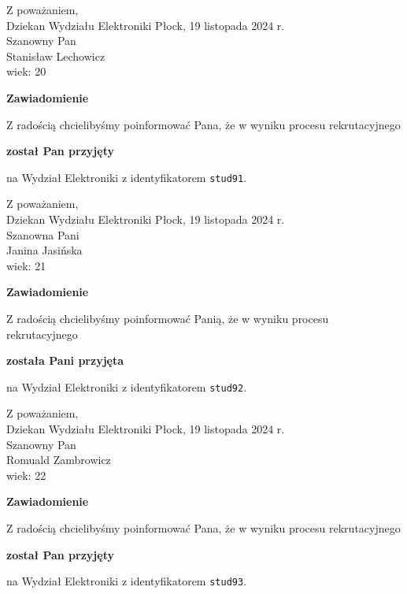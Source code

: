 \documentclass[12pt,a4paper]{article}
\begin{document}
\noindent
Z poważaniem,\\
Dziekan
Wydziału Elektroniki
\newpage
\hfill Płock, 19 listopada 2024 r.\\ 
\noindent 
Szanowny Pan \\
Stanisław Lechowicz \\
wiek: 20

\bigskip

\begin{center}
{\Large\textbf{Zawiadomienie}}
\end{center}
\bigskip
Z radością chcielibyśmy poinformować Pana, że w wyniku procesu rekrutacyjnego
\begin{center}
\textsf{\textbf{został Pan przyjęty}} 
\end{center}
na Wydział Elektroniki z identyfikatorem \verb|stud91|.
\vspace{2cm}

\noindent
Z poważaniem,\\
Dziekan
Wydziału Elektroniki
\newpage
\hfill Płock, 19 listopada 2024 r.\\ 
\noindent 
Szanowna Pani \\
Janina Jasińska \\
wiek: 21

\bigskip

\begin{center}
{\Large\textbf{Zawiadomienie}}
\end{center}
\bigskip
Z radością chcielibyśmy poinformować Panią, że w wyniku procesu rekrutacyjnego
\begin{center}
\textsf{\textbf{została Pani przyjęta}} 
\end{center}
na Wydział Elektroniki z identyfikatorem \verb|stud92|.
\vspace{2cm}

\noindent
Z poważaniem,\\
Dziekan
Wydziału Elektroniki
\newpage
\hfill Płock, 19 listopada 2024 r.\\ 
\noindent 
Szanowny Pan \\
Romuald Zambrowicz \\
wiek: 22

\bigskip

\begin{center}
{\Large\textbf{Zawiadomienie}}
\end{center}
\bigskip
Z radością chcielibyśmy poinformować Pana, że w wyniku procesu rekrutacyjnego
\begin{center}
\textsf{\textbf{został Pan przyjęty}} 
\end{center}
na Wydział Elektroniki z identyfikatorem \verb|stud93|.
\vspace{2cm}
\end{document}

